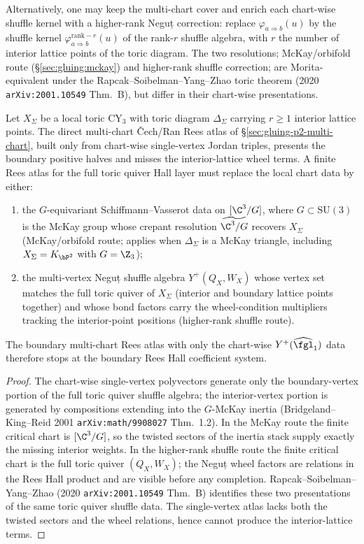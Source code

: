 Alternatively, one may keep the multi-chart cover and enrich each
chart-wise shuffle kernel with a higher-rank Neguț correction: replace
$\varphi_{a \Rightarrow b}(u)$ by the shuffle kernel
$\varphi_{a \Rightarrow b}^{\mathrm{rank-}r}(u)$ of the rank-$r$ shuffle
algebra, with $r$ the number of interior lattice points of the toric
diagram. The two resolutions; McKay/orbifold route (\S\ref{sec:gluing:mckay}) and
higher-rank shuffle correction; are Morita-equivalent under the
Rapcak--Soibelman--Yang--Zhao toric theorem (2020
\texttt{arXiv:2001.10549} Thm.~B), but differ in their chart-wise
presentations.

\begin{proposition}
\label{prop:compact-cycle-obstruction}
Let $X_\Sigma$ be a local toric CY$_3$ with toric diagram $\Delta_\Sigma$
carrying $r \geq 1$ interior lattice points. The direct multi-chart
\v{C}ech/Ran Rees atlas of \S\ref{sec:gluing-p2-multi-chart}, built only
from chart-wise single-vertex Jordan triples, presents the boundary
positive halves and misses the interior-lattice wheel terms. A finite
Rees atlas for the full toric quiver Hall layer must replace the local
chart data by either:
\begin{enumerate}[label=\emph{(\alph*)}, leftmargin=2em]
\item the $G$-equivariant Schiffmann--Vasserot data on $[\C^3 / G]$,
 where $G \subset \mathrm{SU}(3)$ is the McKay group whose crepant
 resolution $\widetilde{\C^3/G}$ recovers $X_\Sigma$ (McKay/orbifold
 route; applies when $\Delta_\Sigma$ is a McKay triangle, including
 $X_\Sigma = K_{\bP^2}$ with $G = \Z_3$);
\item the multi-vertex Neguț shuffle algebra $Y^+(Q_X, W_X)$ whose
 vertex set matches the full toric quiver of $X_\Sigma$ (interior and
 boundary lattice points together) and whose bond factors carry the
 wheel-condition multipliers tracking the interior-point positions
 (higher-rank shuffle route).
\end{enumerate}
The boundary multi-chart Rees atlas with only the chart-wise
$Y^+(\widehat{\fgl}_1)$ data therefore stops at the boundary Rees Hall
coefficient system.
\end{proposition}

\begin{proof}
The chart-wise single-vertex polyvectors generate only the
boundary-vertex portion of the full toric quiver shuffle algebra; the
interior-vertex portion is generated by compositions extending into the
$G$-McKay inertia (Bridgeland--King--Reid 2001 \texttt{arXiv:math/9908027}
Thm.~1.2). In the McKay route the finite critical chart is
$[\C^3/G]$, so the twisted sectors of the inertia stack supply exactly
the missing interior weights. In the higher-rank shuffle route the
finite critical chart is the full toric quiver $(Q_X,W_X)$; the
Neguț wheel factors are relations in the Rees Hall product and are
visible before any completion. Rapcak--Soibelman--Yang--Zhao (2020
\texttt{arXiv:2001.10549} Thm.~B) identifies these two presentations of
the same toric quiver shuffle data. The single-vertex atlas lacks both
the twisted sectors and the wheel relations, hence cannot produce the
interior-lattice terms.
\end{proof}

